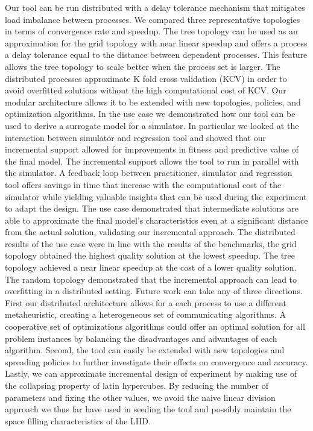 Our tool can be run distributed with a delay tolerance mechanism that mitigates load imbalance between processes. We compared three representative topologies in terms of convergence rate and speedup. The tree topology can be used as an approximation for the grid topology with near linear speedup and offers a process a delay tolerance equal to the distance between dependent processes. This feature allows the tree topology to scale better when the process set is larger. 
The distributed processes approximate K fold cross validation (KCV) in order to avoid overfitted solutions without the high computational cost of KCV. 
Our modular architecture allows it to be extended with new topologies, policies, and optimization algorithms. 
In the use case we demonstrated how our tool can be used to derive a surrogate model for a simulator. In particular we looked at the interaction between simulator and regression tool and showed that our incremental support allowed for improvements in fitness and predictive value of the final model. The incremental support allows the tool to run in parallel with the simulator. A feedback loop between practitioner, simulator and regression tool offers savings in time that increase with the computational cost of the simulator while yielding valuable insights that can be used during the experiment to adapt the design. The use case demonstrated that intermediate solutions are able to approximate the final model's characteristics even at a significant distance from the actual solution, validating our incremental approach.
The distributed results of the use case were in line with the results of the benchmarks, the grid topology obtained the highest quality solution at the lowest speedup. The tree topology achieved a near linear speedup at the cost of a lower quality solution. The random topology demonstrated that the incremental approach can lead to overfitting in a distributed setting. 
Future work can take any of three directions. First our distributed architecture allows for a each process to use a different metaheuristic, creating a heterogeneous set of communicating algorithms. A cooperative set of optimizations algorithms could offer an optimal solution for all problem instances by balancing the disadvantages and advantages of each algorithm. 
Second, the tool can easily be extended with new topologies and spreading policies to further investigate their effects on convergence and accuracy. Lastly, we can approximate incremental design of experiment by making use of the collapsing property of latin hypercubes. By reducing the number of parameters and fixing the other values, we avoid the naive linear division approach we thus far have used in seeding the tool and possibly maintain the space filling characteristics of the LHD.

